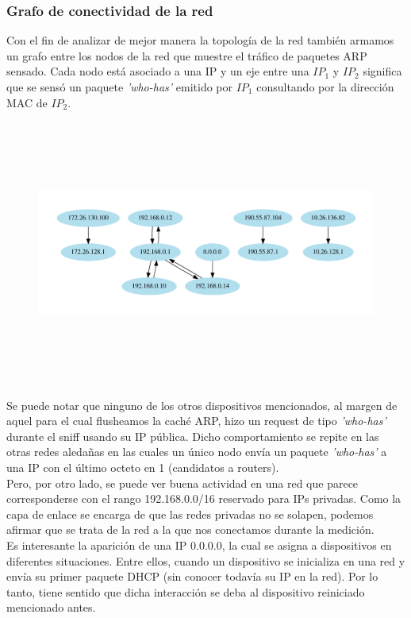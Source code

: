 \newpage
\subsubsection{Grafo de conectividad de la red}
Con el fin de analizar de mejor manera la topología de la red también armamos un grafo entre los nodos de la red que muestre el tráfico de paquetes ARP sensado. Cada nodo está asociado a una IP y un eje entre una $IP_1$ y $IP_2$ significa que se sensó un paquete \emph{'who-has'} emitido por $IP_1$ consultando por la dirección MAC de $IP_2$.

\begin{figure}[H]
	\includegraphics[width=15cm, height=8.7cm]{../img/red-Tatooine-Lan.pdf}
\end{figure}

Se puede notar que ninguno de los otros dispositivos mencionados, al margen de aquel para el cual flusheamos la caché ARP, hizo un request de tipo \emph{'who-has'} durante el sniff usando su IP pública. Dicho comportamiento se repite en las otras redes aledañas en las cuales un único nodo envía un paquete \emph{'who-has'} a una IP con el último octeto en 1 (candidatos a routers).
\\

Pero, por otro lado, se puede ver buena actividad en una red que parece corresponderse con el rango 192.168.0.0/16 reservado para IPs privadas. Como la capa de enlace se encarga de que las redes privadas no se solapen, podemos afirmar que se trata de la red a la que nos conectamos durante la medición.
\\

Es interesante la aparición de una IP 0.0.0.0, la cual se asigna a dispositivos en diferentes situaciones. Entre ellos, cuando un dispositivo se inicializa en una red y envía su primer paquete DHCP (sin conocer todavía su IP en la red). Por lo tanto, tiene sentido que dicha interacción se deba al dispositivo reiniciado mencionado antes.

